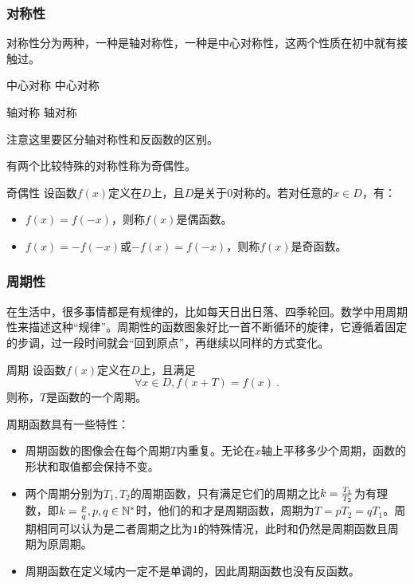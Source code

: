 \subsubsection{对称性}

对称性分为两种，一种是轴对称性，一种是中心对称性，这两个性质在初中就有接触过。

\begin{definition}{中心对称}
中心对称
\end{definition}

\begin{definition}{轴对称}
轴对称
\end{definition}

注意这里要区分轴对称性和反函数的区别。

有两个比较特殊的对称性称为奇偶性。

\begin{definition}{奇偶性}
设函数$f(x)$定义在$D$上，且$D$是关于$0$对称的。若对任意的$x\in D$，有：
\begin{itemize}
\item $f(x)=f(-x)$，则称$f(x)$是偶函数。
\item $f(x)=-f(-x)$或$-f(x)=f(-x)$，则称$f(x)$是奇函数。
\end{itemize}
\end{definition}

\subsubsection{周期性}

在生活中，很多事情都是有规律的，比如每天日出日落、四季轮回。数学中用周期性来描述这种“规律”。周期性的函数图象好比一首不断循环的旋律，它遵循着固定的步调，过一段时间就会“回到原点”，再继续以同样的方式变化。

\begin{definition}{周期}
设函数$f(x)$定义在$D$上，且满足
\begin{equation}
\forall x\in D,f(x+T)=f(x)~.
\end{equation}
则称，$T$是函数的一个周期。
\end{definition}


周期函数具有一些特性：
\begin{itemize}
\item 周期函数的图像会在每个周期$T$内重复。无论在$x$轴上平移多少个周期，函数的形状和取值都会保持不变。
\item 两个周期分别为$T_1,T_2$的周期函数，只有满足它们的周期之比$k={T_1\over T_2}$为有理数，即$k={p\over q},p,q\in\mathbb{N}^*$时，他们的和才是周期函数，周期为$T=pT_2=qT_1$。周期相同可以认为是二者周期之比为$1$的特殊情况，此时和仍然是周期函数且周期为原周期。
\item 周期函数在定义域内一定不是单调的，因此周期函数也没有反函数。
\end{itemize}

